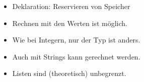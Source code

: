\begin{fframe}
    \intvariablessrcblock
    \begin{itemize}
        \item<2-> Deklaration: \alert{Reservieren von Speicher}
        \item<2-> Rechnen mit den Werten ist möglich.
    \end{itemize}
\end{fframe}

\begin{fframe}
    \stringvariablessrcblock
    \begin{itemize}
        \item<2-> Wie bei Integern, nur der \alert{Typ} ist anders.
        \item<2-> Auch mit Strings kann gerechnet werden.
    \end{itemize}
\end{fframe}

\begin{fframe}
    \listvariablessrcblock
    \begin{itemize}
        \item<2-> Listen sind (theoretisch) unbegrenzt.
    \end{itemize}
\end{fframe}

